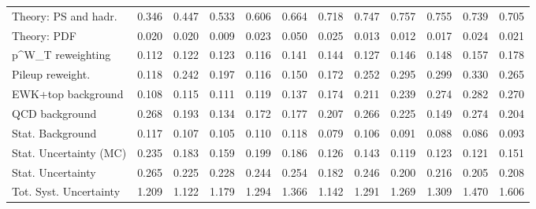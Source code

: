 \begin{tabular}{l|p{0.6cm}p{0.6cm}p{0.6cm}p{0.6cm}p{0.6cm}p{0.6cm}p{0.6cm}p{0.6cm}p{0.6cm}p{0.6cm}p{0.6cm}}
Theory: PS and hadr.                     & 0.346 & 0.447 & 0.533 & 0.606 & 0.664 & 0.718 & 0.747 & 0.757 & 0.755 & 0.739 & 0.705 \\
Theory: PDF                              & 0.020 & 0.020 & 0.009 & 0.023 & 0.050 & 0.025 & 0.013 & 0.012 & 0.017 & 0.024 & 0.021 \\
p^{W}_{T} reweighting                    & 0.112 & 0.122 & 0.123 & 0.116 & 0.141 & 0.144 & 0.127 & 0.146 & 0.148 & 0.157 & 0.178 \\
Pileup reweight.                         & 0.118 & 0.242 & 0.197 & 0.116 & 0.150 & 0.172 & 0.252 & 0.295 & 0.299 & 0.330 & 0.265 \\
EWK+top background                       & 0.108 & 0.115 & 0.111 & 0.119 & 0.137 & 0.174 & 0.211 & 0.239 & 0.274 & 0.282 & 0.270 \\
QCD background                           & 0.268 & 0.193 & 0.134 & 0.172 & 0.177 & 0.207 & 0.266 & 0.225 & 0.149 & 0.274 & 0.204 \\
Stat. Background                         & 0.117 & 0.107 & 0.105 & 0.110 & 0.118 & 0.079 & 0.106 & 0.091 & 0.088 & 0.086 & 0.093 \\
Stat. Uncertainty (MC)                   & 0.235 & 0.183 & 0.159 & 0.199 & 0.186 & 0.126 & 0.143 & 0.119 & 0.123 & 0.121 & 0.151 \\
\hline
Stat. Uncertainty                        & 0.265 & 0.225 & 0.228 & 0.244 & 0.254 & 0.182 & 0.246 & 0.200 & 0.216 & 0.205 & 0.208 \\
\hline
Tot. Syst. Uncertainty                   & 1.209 & 1.122 & 1.179 & 1.294 & 1.366 & 1.142 & 1.291 & 1.269 & 1.309 & 1.470 & 1.606 \\
\hline
\end{tabular}
